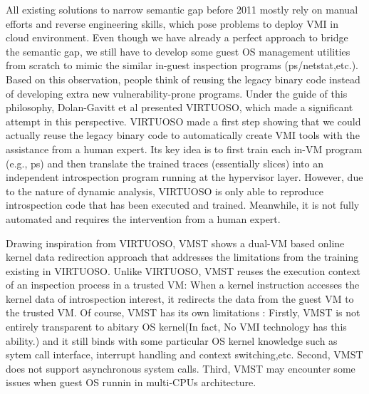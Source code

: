 All existing solutions to narrow semantic gap before 2011 mostly rely on manual efforts and reverse engineering skills, which pose 
problems to deploy VMI in cloud environment. Even though we have already a perfect approach to bridge the semantic gap, we still have 
to develop some guest OS management utilities from scratch to mimic the similar in-guest inspection programs (ps/netstat,etc.). Based 
on this observation, people think of reusing the legacy binary code instead of developing extra new vulnerability-prone programs. Under
the guide of this philosophy, Dolan-Gavitt et al \cite{Reference27} presented VIRTUOSO, which made a significant attempt in this 
perspective. VIRTUOSO made a first step showing that we could actually reuse the legacy binary code to automatically create VMI tools 
with the assistance from a human expert. Its key idea is to first 
train each in-VM program (e.g., ps) and then translate the trained traces (essentially slices) into an independent introspection program running
at the hypervisor layer. However, due to the nature of dynamic analysis, VIRTUOSO is only able to reproduce introspection code that has been 
executed and trained. Meanwhile, it is not fully automated and requires the intervention from a human expert.

Drawing inspiration from VIRTUOSO, VMST \cite{Reference28} shows a dual-VM based online kernel data redirection approach that addresses
the limitations from the training existing in VIRTUOSO. Unlike VIRTUOSO, VMST reuses the execution context of an inspection process in 
a trusted VM: When a kernel instruction accesses the kernel data of introspection interest, it redirects the data from the guest VM to
the trusted VM. Of course, VMST has its own limitations : Firstly, VMST is not entirely transparent to abitary OS kernel(In fact, No VMI 
technology has this ability.) and it still binds with some particular OS kernel knowledge such as sytem call interface, interrupt 
handling and context switching,etc. Second, VMST does not support asynchronous system calls. Third, VMST may encounter some issues when
guest OS runnin in multi-CPUs architecture.

